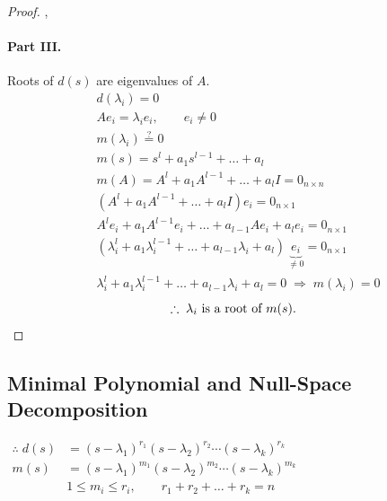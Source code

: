\begin{proof}
\sep
\paragraph{Part III.} Roots of $d(s)$ are eigenvalues of $A$.
\begin{align*}
&d(\lambda_i)=0\\
&Ae_i=\lambda_ie_i, \qquad e_i\neq 0\\
&m(\lambda_i)\stackrel{?}{=}0\\
&m(s)=s^l+a_1s^{l-1}+\dots+a_l\\
&m(A)=A^l+a_1A^{l-1}+\dots+a_lI=0_{n\times n}\\
&(A^l+a_1A^{l-1}+\dots+a_lI)e_i=0_{n\times 1}\\
&A^le_i+a_1A^{l-1}e_i+\dots+a_{l-1}Ae_i+a_le_i=0_{n\times1}\\
&(\lambda_i^l+a_1\lambda_i^{l-1}+\dots+a_{l-1}\lambda_i+a_l)\,\underbrace{e_i}_{\neq0}=0_{n\times1}\\
&\lambda_i^l+a_1\lambda_i^{l-1}+\dots+a_{l-1}\lambda_i+a_l=0 \;\Rightarrow\; m(\lambda_i)=0
\end{align*}
\[ \therefore\;\lambda_i \text{ is a root of } m(s). \qedhere \]
\end{proof}

\subsection{Minimal Polynomial and Null-Space Decomposition}\label{ss:minpoly-decomp}
\begin{keybox}
\noindent\hfil$\displaystyle\begin{aligned}
\therefore\; d(s)&=(s-\lambda_1)^{r_1}(s-\lambda_2)^{r_2}\cdots(s-\lambda_k)^{r_k}\\
m(s)&=(s-\lambda_1)^{m_1}(s-\lambda_2)^{m_2}\cdots(s-\lambda_k)^{m_k}\\
&1\le m_i\le r_i, \qquad r_1+r_2+\dots+r_k=n
\end{aligned}$\hfil
\end{keybox}

